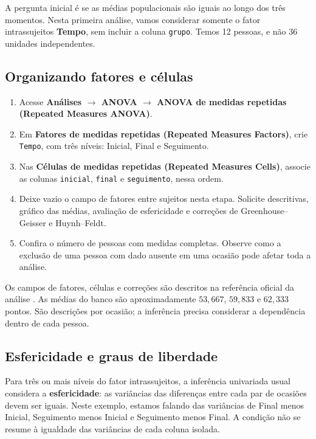 A pergunta inicial é se as médias populacionais são iguais ao longo dos três momentos. Nesta primeira análise, vamos considerar somente o fator intrassujeitos \textbf{Tempo}, sem incluir a coluna \texttt{grupo}. Temos 12 pessoas, e não 36 unidades independentes.

\subsection{Organizando fatores e células}

\begin{enumerate}
  \item Acesse \textbf{Análises $\rightarrow$ ANOVA $\rightarrow$ ANOVA de medidas repetidas (Repeated Measures ANOVA)}.
  \item Em \textbf{Fatores de medidas repetidas (Repeated Measures Factors)}, crie \texttt{Tempo}, com três níveis: Inicial, Final e Seguimento.
  \item Nas \textbf{Células de medidas repetidas (Repeated Measures Cells)}, associe as colunas \texttt{inicial}, \texttt{final} e \texttt{seguimento}, nessa ordem.
  \item Deixe vazio o campo de fatores entre sujeitos nesta etapa. Solicite descritivas, gráfico das médias, avaliação de esfericidade e correções de Greenhouse--Geisser e Huynh--Feldt.
  \item Confira o número de pessoas com medidas completas. Observe como a exclusão de uma pessoa com dado ausente em uma ocasião pode afetar toda a análise.
\end{enumerate}

Os campos de fatores, células e correções são descritos na referência oficial da análise \parencite{JamoviAnovaRM}. As médias do banco são aproximadamente $53{,}667$, $59{,}833$ e $62{,}333$ pontos. São descrições por ocasião; a inferência precisa considerar a dependência dentro de cada pessoa.

\subsection{Esfericidade e graus de liberdade}

Para três ou mais níveis do fator intrassujeitos, a inferência univariada usual considera a \textbf{esfericidade}: as variâncias das diferenças entre cada par de ocasiões devem ser iguais. Neste exemplo, estamos falando das variâncias de Final menos Inicial, Seguimento menos Inicial e Seguimento menos Final. A condição não se resume à igualdade das variâncias de cada coluna isolada.

